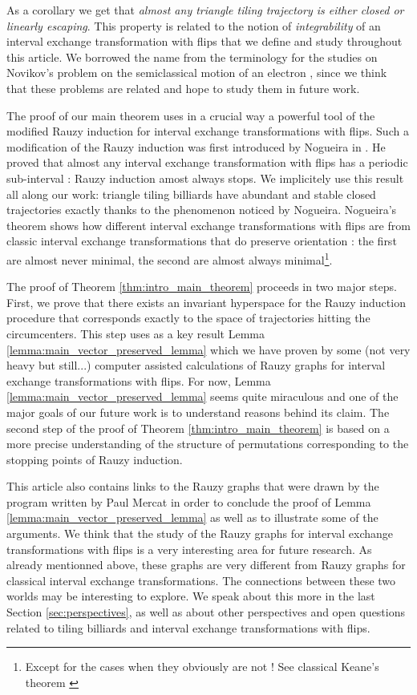\documentclass[12pt]{article}
\theoremstyle{definition}
\begin{document}
As a corollary we get that \emph{almost any triangle tiling trajectory is either closed or linearly escaping}. This property is related to the notion of \emph{integrability} of an interval exchange transformation with flips that we define and study throughout this article. We borrowed the name from the terminology for the studies on Novikov's problem on the semiclassical motion of an electron \cite{N82, Z84, D97}, since we think that these problems are related and hope to study them in future work.  

The proof of our main theorem uses in a crucial way a powerful tool of the modified Rauzy induction for interval exchange transformations with flips. Such a modification of the Rauzy induction was first introduced by Nogueira in \cite{N89}. He proved that almost any interval exchange transformation with flips has a periodic sub-interval :  Rauzy induction amost always stops. We implicitely use this result all along our work: triangle tiling billiards have abundant and stable closed trajectories exactly thanks to the phenomenon noticed by Nogueira. Nogueira's theorem shows how different interval exchange transformations with flips are from classic interval exchange transformations that do preserve orientation : the first are almost never minimal, the second are almost always minimal\footnote{Except for the cases when they obviously are not ! See classical Keane's theorem \cite{K75}}.

The proof of Theorem \ref{thm:intro_main_theorem} proceeds in two major steps. First, we prove that there exists an invariant hyperspace for the Rauzy induction procedure that corresponds exactly to the space of trajectories hitting the circumcenters. This step uses as a key result Lemma \ref{lemma:main_vector_preserved_lemma} which we have proven by some (not very heavy but still...) computer assisted calculations of Rauzy graphs for interval exchange transformations with flips. For now, Lemma \ref{lemma:main_vector_preserved_lemma} seems quite miraculous and one of the major goals of our future work is to understand reasons behind its claim. The second step of the proof of Theorem \ref{thm:intro_main_theorem} is based on a more precise understanding of the structure of permutations corresponding to the stopping points of Rauzy induction. 

This article also contains links to the Rauzy graphs that were drawn by the program written by Paul Mercat in order to conclude the proof of Lemma \ref{lemma:main_vector_preserved_lemma} as well as to illustrate some of the arguments. We think that the study of the Rauzy graphs for interval exchange transformations with flips is a very interesting area for future research. As already mentionned above, these graphs are very different from Rauzy graphs for classical interval exchange transformations. The connections between these two worlds may be interesting to explore. We speak about this more in the last Section \ref{sec:perspectives}, as well as about other perspectives and open questions related to tiling billiards and interval exchange transformations with flips. 
\end{document}
